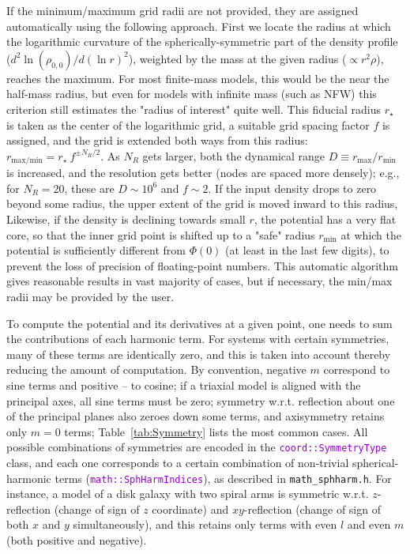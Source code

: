 \documentclass[12pt]{article}
\newcommand{\ttt}[1]{\textcolor{darkviolet}{\texttt{#1}}}
\begin{document}
If the minimum/maximum grid radii are not provided, they are assigned automatically using the following approach. First we locate the radius at which the logarithmic curvature of the spherically-symmetric part of the density profile ($d^2\ln(\rho_{0,0})/d(\ln r)^2$), weighted by the mass at the given radius ($\propto r^2\rho$), reaches the maximum. For most finite-mass models, this would be the near the half-mass radius, but even for models with infinite mass (such as NFW) this criterion still estimates the "radius of interest" quite well. This fiducial radius $r_\star$ is taken as the center of the logarithmic grid, a suitable grid spacing factor $f$ is assigned, and the grid is extended both ways from this radius: $r_\mathrm{max/min} = r_\star\: f^{\pm N_R/2}$. As $N_R$ gets larger, both the dynamical range $D\equiv r_\mathrm{max}/r_\mathrm{min}$ is increased, and the resolution gets better (nodes are spaced more densely); e.g., for $N_R=20$, these are $D\sim 10^6$ and $f\sim 2$. If the input density drops to zero beyond some radius, the upper extent of the grid is moved inward to this radius, Likewise, if the density is declining towards small $r$, the potential has a very flat core, so that the inner grid point is shifted up to a "safe" radius $r_\mathrm{min}$ at which the potential is sufficiently different from $\Phi(0)$ (at least in the last few digits), to prevent the loss of precision of floating-point numbers. This automatic algorithm gives reasonable results in vast majority of cases, but if necessary, the min/max radii may be provided by the user.

To compute the potential and its derivatives at a given point, one needs to sum the contributions of each harmonic term. For systems with certain symmetries, many of these terms are identically zero, and this is taken into account thereby reducing the amount of computation. By convention, negative $m$ correspond to sine terms and positive -- to cosine; if a triaxial model is aligned with the principal axes, all sine terms must be zero; symmetry w.r.t. reflection about one of the principal planes also zeroes down some terms, and axisymmetry retains only $m=0$ terms; Table~\ref{tab:Symmetry} lists the most common cases. All possible combinations of symmetries are encoded in the \ttt{coord::SymmetryType} class, and each one corresponds to a certain combination of non-trivial spherical-harmonic terms (\ttt{math::SphHarmIndices}), as described in \texttt{math_sphharm.h}. For instance, a model of a disk galaxy with two spiral arms is symmetric w.r.t. $z$-reflection (change of sign of $z$ coordinate) and $xy$-reflection (change of sign of both $x$ and $y$ simultaneously), and this retains only terms with even $l$ and even $m$ (both positive and negative).
\end{document}
